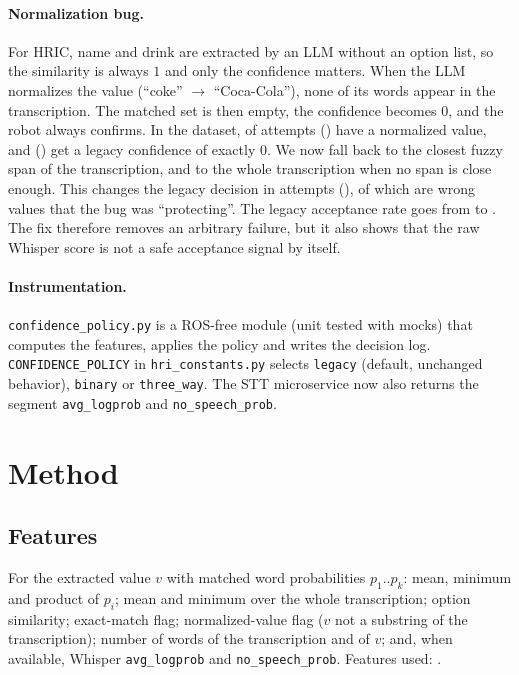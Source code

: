 \documentclass[10pt,a4paper]{article}
\newcommand{\code}[1]{\texttt{#1}}
\begin{document}
\paragraph{Normalization bug.} For HRIC, name and drink are extracted by an LLM without an option list, so the
similarity is always $1$ and only the confidence matters. When the LLM normalizes the value (``coke'' $\to$
``Coca-Cola''), none of its words appear in the transcription. The matched set is then empty, the confidence
becomes $0$, and the robot always confirms. In the dataset, \WOneNormalized{} of \WOneAttempts{} attempts
(\WOneNormalizedPct) have a normalized value, and \WOneZeroConf{} (\WOneZeroConfPct) get a legacy confidence of
exactly $0$. We now fall back to the closest fuzzy span of the transcription, and to the whole transcription
when no span is close enough. This changes the legacy decision in \WOneFlipped{} attempts
(\WOneFlippedPct), \WOneFlippedWrong{} of which are wrong values that the bug was ``protecting''. The legacy
acceptance rate goes from \WOneLegacyOldAccept{} to \WOneLegacyFixAccept. The fix therefore removes an
arbitrary failure, but it also shows that the raw Whisper score is not a safe acceptance signal by itself.

\paragraph{Instrumentation.} \code{confidence\_policy.py} is a ROS-free module (unit tested with mocks) that
computes the features, applies the policy and writes the decision log. \code{CONFIDENCE\_POLICY} in
\code{hri\_constants.py} selects \code{legacy} (default, unchanged behavior), \code{binary} or \code{three\_way}.
The STT microservice now also returns the segment \code{avg\_logprob} and \code{no\_speech\_prob}.

\section{Method}
\subsection{Features}
\label{sec:features}
For the extracted value $v$ with matched word probabilities $p_1..p_k$: mean, minimum and product of $p_i$;
mean and minimum over the whole transcription; option similarity; exact-match flag; normalized-value flag
($v$ not a substring of the transcription); number of words of the transcription and of $v$; and, when
available, Whisper \code{avg\_logprob} and \code{no\_speech\_prob}. Features used: \FeatureList.
\end{document}
